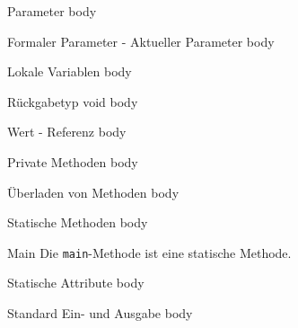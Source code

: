 \documentclass[18pt]{beamer}
\begin{document}
\begin{frame}{Parameter}
    body
\end{frame}

\begin{frame}{Formaler Parameter - Aktueller Parameter}
    body
\end{frame}

\begin{frame}{Lokale Variablen}
    body
\end{frame}

\begin{frame}{Rückgabetyp void}
    body
\end{frame}

\begin{frame}{Wert - Referenz}
    body
\end{frame}

\begin{frame}{Private Methoden}
    body
\end{frame}

\begin{frame}{Überladen von Methoden}
    body
\end{frame}

\begin{frame}{Statische Methoden}
    body
\end{frame}

\begin{frame}{Main}
    Die \texttt{main}-Methode ist eine statische Methode.

\end{frame}

\begin{frame}{Statische Attribute}
    body
\end{frame}

\begin{frame}{Standard Ein- und Ausgabe}
    body
\end{frame}

\appendix
\beginbackup
\end{document}
